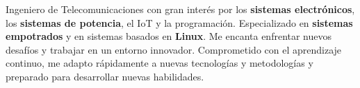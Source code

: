 \documentclass[10pt,a4paper,ragged2e,withhyper]{altacv}
\begin{document}


\makecvheader



Ingeniero de Telecomunicaciones con gran interés por los \textbf{sistemas electrónicos}, los \textbf{sistemas de potencia}, el IoT y la programación. Especializado en \textbf{sistemas empotrados} y en sistemas basados en \textbf{Linux}. Me encanta enfrentar nuevos desafíos y trabajar en un entorno innovador. Comprometido con el aprendizaje continuo, me adapto rápidamente a nuevas tecnologías y metodologías y preparado para desarrollar nuevas habilidades.
\end{document}
